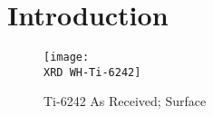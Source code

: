 \chapter{Introduction}
\begin{figure}[H]
    \centering
        \texttt{[image: \\XRD WH-Ti-6242]}
        \caption{Ti-6242 As Received; Surface}
    \label{fig:EDM-Cut}
\end{figure}

